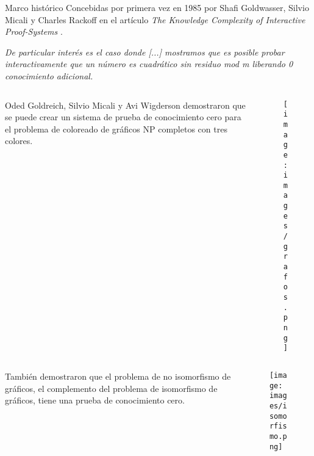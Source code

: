\documentclass[8pt,xcolor=dvipsnames]{beamer}
\begin{document}
\begin{frame}[fragile]{Marco histórico}
    Concebidas por primera vez en 1985 por Shafi Goldwasser, Silvio Micali y Charles Rackoff en el artículo \textit{The Knowledge Complexity of Interactive Proof-Systems} \cite{Historia}.

    \begin{center}
        \textit{De particular interés es el caso donde [...] mostramos que es posible probar interactivamente que un número es cuadrático sin residuo mod m liberando 0 conocimiento adicional.}
    \end{center}

    \vspace{0.25cm}
    
    \begin{columns}
        \begin{column}{0.7\textwidth}
            Oded Goldreich, Silvio Micali y Avi Wigderson demostraron que se puede crear un sistema de prueba de conocimiento cero para el problema de coloreado de gráficos NP completos con tres colores.
        \end{column}
        \begin{column}{0.25\textwidth}
            \begin{figure}
                \centering
                \texttt{[image: images/grafos.png]}
            \end{figure}
        \end{column}
    \end{columns}

    \vspace{0.25cm}
    
    \begin{columns}
        \begin{column}{0.6\textwidth}
            También demostraron que el problema de no isomorfismo de gráficos, el complemento del problema de isomorfismo de gráficos, tiene una prueba de conocimiento cero.
        \end{column}
        \begin{column}{0.35\textwidth}
            \begin{figure}
                \centering
                \texttt{[image: images/isomorfismo.png]}
            \end{figure}            
        \end{column}
    \end{columns}
\end{frame}
\end{document}
